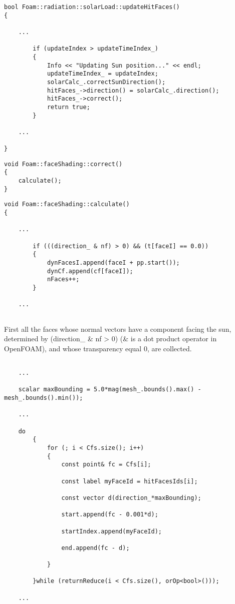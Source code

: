 \begin{verbatim}
bool Foam::radiation::solarLoad::updateHitFaces()
{

    ...
    
        if (updateIndex > updateTimeIndex_)
        {
            Info << "Updating Sun position..." << endl;
            updateTimeIndex_ = updateIndex;
            solarCalc_.correctSunDirection();
            hitFaces_->direction() = solarCalc_.direction();
            hitFaces_->correct();
            return true;
        }
        
    ...    
        
}
\end{verbatim}
\begin{verbatim}
void Foam::faceShading::correct()
{
    calculate();
}
\end{verbatim}
\begin{verbatim}
void Foam::faceShading::calculate()
{

    ...

        if (((direction_ & nf) > 0) && (t[faceI] == 0.0))
        {
            dynFacesI.append(faceI + pp.start());
            dynCf.append(cf[faceI]);
            nFaces++;
        }

    ...
    
\end{verbatim}

First all the faces whose normal vectors have a component facing the sun, determined by (direction\_ \& nf > 0) (\& is a dot product operator in OpenFOAM), and whose transparency equal 0, are collected.

\begin{verbatim}
    
    ...
    
    scalar maxBounding = 5.0*mag(mesh_.bounds().max() - mesh_.bounds().min());
    
    ...
    
    do
        {
            for (; i < Cfs.size(); i++)
            {
                const point& fc = Cfs[i];
    
                const label myFaceId = hitFacesIds[i];
    
                const vector d(direction_*maxBounding);
    
                start.append(fc - 0.001*d);
    
                startIndex.append(myFaceId);
    
                end.append(fc - d);
    
            }
    
        }while (returnReduce(i < Cfs.size(), orOp<bool>()));
        
    ...
\end{verbatim}

